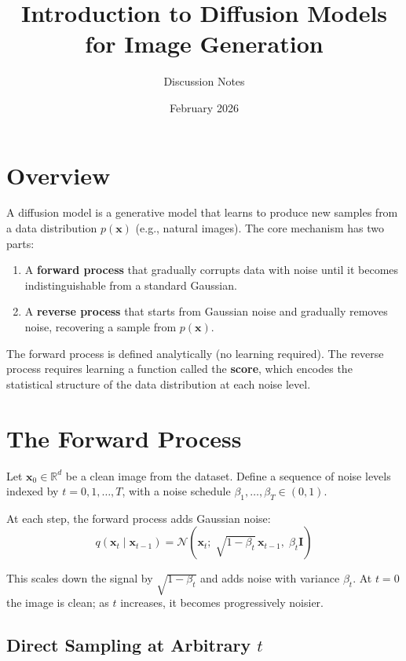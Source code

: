 \documentclass[11pt]{article}
\title{Introduction to Diffusion Models for Image Generation}
\author{Discussion Notes}
\date{February 2026}
\newcommand{\xb}{\mathbf{x}}
\newcommand{\Ib}{\mathbf{I}}
\newcommand{\R}{\mathbb{R}}
\begin{document}
  \maketitle

  \section{Overview}

  A diffusion model is a generative model that learns to produce new samples
  from a data distribution $p(\xb)$ (e.g., natural images). The core mechanism
  has two parts:

  \begin{enumerate}[nosep]
      \item A \textbf{forward process} that gradually corrupts data with noise
            until it becomes indistinguishable from a standard Gaussian.
      \item A \textbf{reverse process} that starts from Gaussian noise and
            gradually removes noise, recovering a sample from $p(\xb)$.
  \end{enumerate}

  The forward process is defined analytically (no learning required). The
  reverse process requires learning a function called the \textbf{score},
  which encodes the statistical structure of the data distribution at each
  noise level.

  \section{The Forward Process}

  Let $\xb_0 \in \R^d$ be a clean image from the dataset. Define a sequence
  of noise levels indexed by $t = 0, 1, \ldots, T$, with a noise schedule
  $\beta_1, \ldots, \beta_T \in (0, 1)$.

  At each step, the forward process adds Gaussian noise:
  \begin{equation}
      q(\xb_t \mid \xb_{t-1}) = \mathcal{N}\!\left(
          \xb_t;\; \sqrt{1 - \beta_t}\, \xb_{t-1},\; \beta_t \Ib
      \right)
      \label{eq:forward_step}
  \end{equation}

  This scales down the signal by $\sqrt{1 - \beta_t}$ and adds noise with
  variance $\beta_t$. At $t = 0$ the image is clean; as $t$ increases, it
  becomes progressively noisier.

  \subsection{Direct Sampling at Arbitrary $t$}
\end{document}
